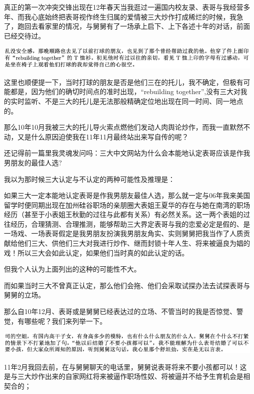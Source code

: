\documentclass[9pt, b5paper]{article}
\begin{document}
真正的第一次冲突交锋出现在12年春天当我逛过一遍国内校友录、表哥与我经营多年、而我心底始终把表哥视作终生归属的爱情被三大炒作打成稀烂的时候，我急了，跑回去看家里的情况，与舅舅有了一场承上启下、上下各述十年的对话，前面已经交待过。

\begin{center}
\includegraphics[width=.9\linewidth]{./pic/backups_plans_20210412_173313.png}
\end{center}

这里也顺便提一下，当时打球的朋友是否是他们三在的托儿，我不确定，但极有可能都是，因为他们的确切时间点的准时出现，“rebuilding together”,没有三大对我的实时监听、不是三大的托儿是无法那般精确定位地出现在同一时间、同一地点的。 

那么10年10月我被三大的托儿导火索点燃他们发动人肉舆论炒作，而我一直默然不动，又是什么原因迫使我在11年11月最终站出来写自传的呢？

还记得前一篇里我灵魂发问吗：三大中文网站为什么会本能地认定表哥应该是作我男朋友的最佳人选?

我以为那时候三大认定与不认定的两种可能性及推理是：

如果三大一定本能地认定表哥是作我男朋友最佳人选，那么就一定与06年我来美国留学时便同期出现在加州硅谷职场的亲朋圈大表姐王夏华的存在与她在南湾的职场经历（甚至于小表姐王秋勤的过往与此都有关系）有必然关系。这一两个表姐的过往经历，合理猜测、合理推测，能够帮助三大界定表哥与我的恋爱必定是假的、是一场戏、一场表哥假定是我男朋友扮演我男朋友角实、实则舅舅把我当作了人质贡献给他们三大、供他们三大对我进行炒作、继而封锁十年人生、将来被逼良为娼的戏！所以三大会如此认定，如果他们当时真的如此认定的话。

但我个人认为上面列出的这种的可能性不大。

而如果当时三大不曾真正认定，那么他们会拖、他们会采取试探办法去试探表哥与舅舅的立场。

那么自10年12月、表哥或是舅舅已经表达过的立场、不管当时的我是否惊觉、警觉，有哪些呢？我们来列举一下。  

\begin{center}
\includegraphics[width=.9\linewidth]{./pic/backups_plans_20210412_170813.png}
\end{center}

11年2月我回去前，在与舅舅聊天的电话里，舅舅说表哥将来不要小孩都可以！这是与三大炒作出来的自家网红将来被逼作职场性奴、将被逼并不给予生育机会是相契合的；
\end{document}
